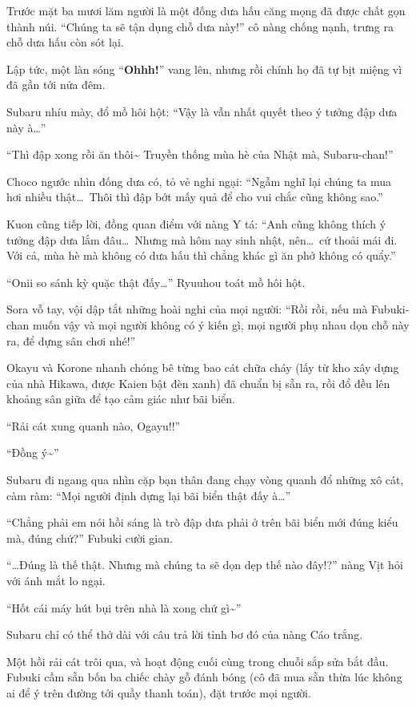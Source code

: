\documentclass[../main.tex]{subfiles}
\begin{document}
Trước mặt ba mươi lăm người là một đống dưa hấu căng mọng đã được chất gọn thành núi. ``Chúng ta sẽ tận dụng chỗ dưa này!'' cô nàng chống nạnh, trưng ra chỗ dưa hấu còn sót lại.

Lập tức, một làn sóng ``\textbf{Ohhh!}'' vang lên, nhưng rồi chính họ đã tự bịt miệng vì đã gần tới nửa đêm.

Subaru nhíu mày, đổ mồ hôi hột: ``Vậy là vẫn nhất quyết theo ý tưởng đập dưa này à\dots''

``Thì đập xong rồi ăn thôi\~{} Truyền thống mùa hè của Nhật mà, Subaru-chan!''

Choco ngước nhìn đống dưa có, tỏ vẻ nghi ngại: ``Ngẫm nghĩ lại chúng ta mua hơi nhiều thật\dots\ Thôi thì đập bớt mấy quả để cho vui chắc cũng không sao.''

Kuon cũng tiếp lời, đồng quan điểm với nàng Y tá: ``Anh cũng không thích ý tưởng đập dưa lắm đâu\dots\ Nhưng mà hôm nay sinh nhật, nên\dots\ cứ thoải mái đi. Với cả, mùa hè mà không có dưa hấu thì chẳng khác gì ăn phở không có quẩy.''

``Onii so sánh kỳ quặc thật đấy\dots'' Ryuuhou toát mồ hôi hột.

Sora vỗ tay, vội dập tắt những hoài nghi của mọi người: ``Rồi rồi, nếu mà Fubuki-chan muốn vậy và mọi người không có ý kiến gì, mọi người phụ nhau dọn chỗ này ra, để dựng sân chơi nhé!''

Okayu và Korone nhanh chóng bê từng bao cát chữa cháy (lấy từ kho xây dựng của nhà Hikawa, được Kaien bật đèn xanh) đã chuẩn bị sẵn ra, rồi đổ đều lên khoảng sân giữa để tạo cảm giác như bãi biển.

``Rải cát xung quanh nào, Ogayu!!''

``Đồng ý\~{}''

Subaru đi ngang qua nhìn cặp bạn thân đang chạy vòng quanh đổ những xô cát, càm ràm: ``Mọi người định dựng lại bãi biển thật đấy à\dots''

``Chẳng phải em nói hồi sáng là trò đập dưa phải ở trên bãi biển mới đúng kiểu mà, đúng chứ?'' Fubuki cười gian.

``\dots Đúng là thế thật. Nhưng mà chúng ta sẽ dọn dẹp thế nào đây!?'' nàng Vịt hỏi với ánh mắt lo ngại.

``Hốt cái máy hút bụi trên nhà là xong chứ gì\~{}''

Subaru chỉ có thể thở dài với câu trả lời tỉnh bơ đó của nàng Cáo trắng.

Một hồi rải cát trôi qua, và hoạt động cuối cùng trong chuỗi sắp sửa bắt đầu. Fubuki cầm sẵn bốn ba chiếc chày gỗ đánh bóng (cô đã mua sẵn thừa lúc không ai để ý trên đường tới quầy thanh toán), đặt trước mọi người.
\end{document}
